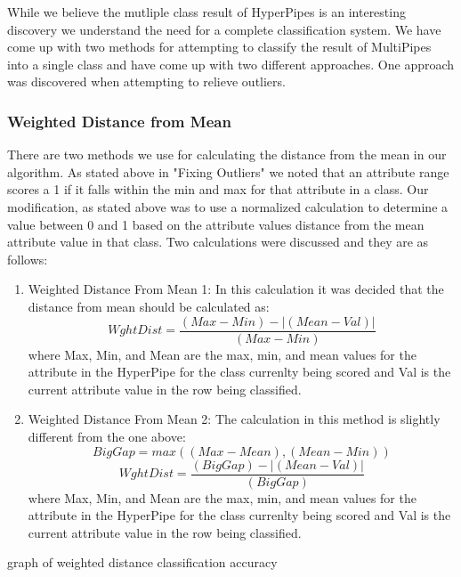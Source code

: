 While we believe the mutliple class result of HyperPipes is 
an interesting discovery we understand the need for a complete 
classification system. We have come up with two methods for
attempting to classify the result of MultiPipes into a single 
class and have come up with two different approaches. One 
approach was discovered when attempting to relieve outliers.
\subsubsection{Weighted Distance from Mean}
There are two methods we use for calculating the distance from 
the mean in our algorithm. As stated above in "Fixing Outliers" 
we noted that an attribute range scores a 1 if it falls within 
the min and max for that attribute in a class. Our modification, 
as stated above was to use a normalized calculation to determine 
a value between 0 and 1 based on the attribute values distance 
from the mean attribute value in that class. Two calculations 
were discussed and they are as follows:
\begin{enumerate}
\item Weighted Distance From Mean 1: In this calculation it was 
decided that the distance from mean should be calculated as:
\begin{equation}
  WghtDist=\frac{(Max-Min)-|(Mean-Val)|}{(Max-Min)}
\end{equation}
where Max, Min, and Mean are the max, min, and mean values for 
the attribute in the HyperPipe for the class currenlty being 
scored and Val is the current attribute value in the row being 
classified. 
\item Weighted Distance From Mean 2: The calculation in this 
method is slightly different from the one above:
\begin{equation}
  BigGap = max((Max-Mean),(Mean-Min))
\end{equation}
\begin{equation}
  WghtDist=\frac{(BigGap)-|(Mean-Val)|}{(BigGap)}
\end{equation}
where Max, Min, and Mean are the max, min, and mean values for 
the attribute in the HyperPipe for the class currenlty being 
scored and Val is the current attribute value in the row being 
classified.
\end{enumerate}



graph of weighted distance classification accuracy
